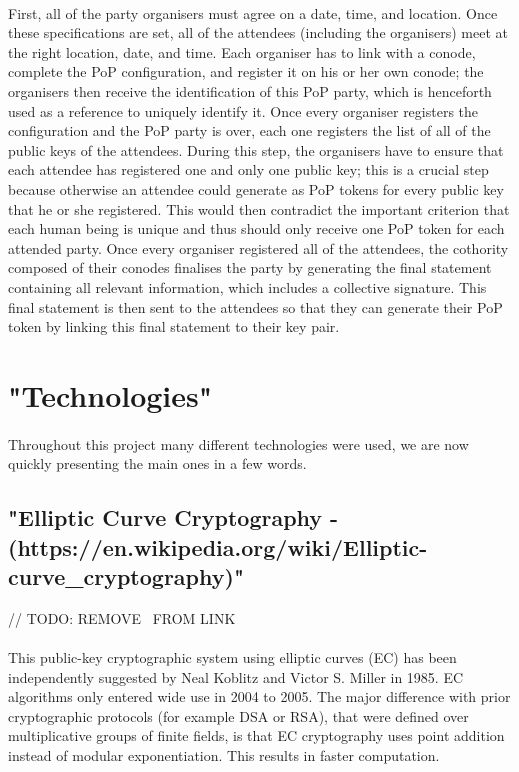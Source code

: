 \paragraph{}
First, all of the party organisers must agree on a date, time, and location. Once these specifications are set, all of the attendees (including the organisers) meet at the right location, date, and time. Each organiser has to link with a conode, complete the PoP configuration, and register it on his or her own conode; the organisers then receive the identification of this PoP party, which is henceforth used as a reference to uniquely identify it. Once every organiser registers the configuration and the PoP party is over, each one registers the list of all of the public keys of the attendees. During this step, the organisers have to ensure that each attendee has registered one and only one public key; this is a crucial step because otherwise an attendee could generate as PoP tokens for every public key that he or she registered. This would then contradict the important criterion that each human being is unique and thus should only receive one PoP token for each attended party. Once every organiser registered all of the attendees, the cothority composed of their conodes finalises the party by generating the final statement containing all relevant information, which includes a collective signature. This final statement is then sent to the attendees so that they can generate their PoP token by linking this final statement to their key pair.

\section{"Technologies"}

\paragraph{}
Throughout this project many different technologies were used, we are now quickly presenting the main ones in a few words.

\subsection{"Elliptic Curve Cryptography - (https://en.wikipedia.org/wiki/Elliptic-curve\_cryptography)"}

// TODO: REMOVE \ FROM LINK

\paragraph{}
This public-key cryptographic system using elliptic curves (EC) has been independently suggested by Neal Koblitz and Victor S. Miller in 1985. EC algorithms only entered wide use in 2004 to 2005. The major difference with prior cryptographic protocols (for example DSA or RSA), that were defined over multiplicative groups of finite fields, is that EC cryptography uses point addition instead of modular exponentiation. This results in faster computation.

